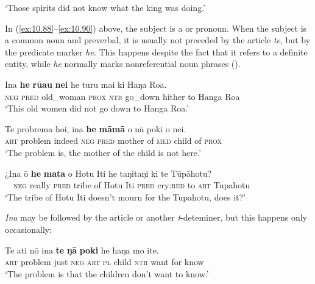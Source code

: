 \glt
‘Those spirits did not know what the king was doing.’ \textstyleExampleref{[R532-06.018]}
\z

In (\ref{ex:10.88}–\ref{ex:10.90}) above, the subject is a  or pronoun. When the subject is a common noun and preverbal, it is usually not preceded by the article \textit{te}, but by the predicate marker \textit{he}. This happens despite the fact that it refers to a definite entity, while \textit{he} normally marks nonreferential noun phrases ().

\ea\label{ex:10.94}
\gll {\ꞌ}Ina \textbf{he} \textbf{rū{\ꞌ}au} \textbf{nei} he turu mai ki Haŋa Roa. \\
\textsc{neg} \textsc{pred} old\_woman \textsc{prox} \textsc{ntr} go\_down hither to Hanga Roa \\

\glt 
‘This old women did not go down to Hanga Roa.’ \textstyleExampleref{[R380.006]} 
\z

\ea\label{ex:10.95}
\gll Te probrema ho{\ꞌ}i, {\ꞌ}ina \textbf{he} \textbf{māmā} o nā poki o nei. \\
\textsc{art} problem indeed \textsc{neg} \textsc{pred} mother of \textsc{med} child of \textsc{prox} \\

\glt 
‘The problem is, the mother of the child is not here.’ \textstyleExampleref{[R403.051]} 
\z

\ea\label{ex:10.96}
\gll ¿{\ꞌ}Ina {\ꞌ}ō \textbf{he} \textbf{mata} o Hotu {\ꞌ}Iti he taŋitaŋi ki te Tūpāhotu?\\
~~\textsc{neg} really \textsc{pred} tribe of Hotu Iti \textsc{pred} cry:\textsc{red} to \textsc{art} Tupahotu\\

\glt
‘The tribe of Hotu Iti doesn’t mourn for the Tupahotu, does it?’ \textstyleExampleref{[R304.070]} 
\z

\textit{{\ꞌ}Ina} may be followed by the article or another \textit{t}{}-deteminer, but this happens only occasionally:

\ea\label{ex:10.97}
\gll Te {\ꞌ}ati nō {\ꞌ}ina \textbf{te} \textbf{ŋā} \textbf{poki} he haŋa mo {\ꞌ}ite. \\
\textsc{art} problem just \textsc{neg} \textsc{art} \textsc{pl} child \textsc{ntr} want for know \\

\glt 
‘The problem is that the children don’t want to know.’ \textstyleExampleref{[R647.094]} 
\z

